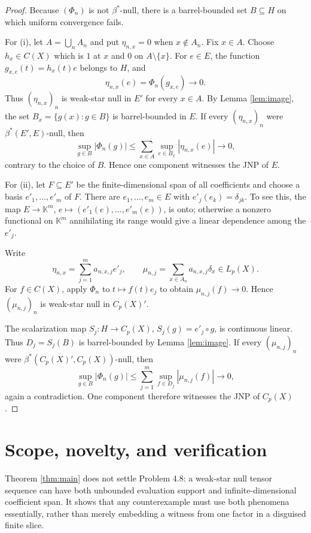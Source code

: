 \documentclass[11pt]{article}
\newcommand{\K}{\mathbb K}
\begin{document}
\begin{proof}
Because $(\Phi_n)$ is not $\beta^*$-null, there is a barrel-bounded set
$B\subseteq H$ on which uniform convergence fails.

For (i), let $A=\bigcup_n A_n$ and put $\eta_{n,x}=0$ when
$x\notin A_n$.  Fix $x\in A$.  Choose $h_x\in C(X)$ which is $1$ at $x$
and $0$ on $A\setminus\{x\}$.  For $e\in E$, the function
$g_{x,e}(t)=h_x(t)e$ belongs to $H$, and
\[
  \eta_{n,x}(e)=\Phi_n(g_{x,e})\longrightarrow 0.
\]
Thus $(\eta_{n,x})_n$ is weak-star null in $E'$ for every $x\in A$.
By Lemma \ref{lem:image}, the set
$B_x=\{g(x):g\in B\}$ is barrel-bounded in $E$.  If every
$(\eta_{n,x})_n$ were $\beta^*(E',E)$-null, then
\[
  \sup_{g\in B}|\Phi_n(g)|
  \leq \sum_{x\in A}\sup_{e\in B_x}|\eta_{n,x}(e)|
  \longrightarrow 0,
\]
contrary to the choice of $B$.  Hence one component witnesses the JNP of
$E$.

For (ii), let $F\subseteq E'$ be the finite-dimensional span of all
coefficients and choose a basis $e'_1,\dots,e'_m$ of $F$.  There are
$e_1,\dots,e_m\in E$ with $e'_j(e_k)=\delta_{jk}$.  To see this, the map
$E\to\K^m$, $e\mapsto(e'_1(e),\dots,e'_m(e))$, is onto; otherwise a
nonzero functional on $\K^m$ annihilating its range would give a linear
dependence among the $e'_j$.

Write
\[
  \eta_{n,x}=\sum_{j=1}^m a_{n,x,j}e'_j,
  \qquad
  \mu_{n,j}=\sum_{x\in A_n}a_{n,x,j}\delta_x\in L_p(X).
\]
For $f\in C(X)$, apply $\Phi_n$ to $t\mapsto f(t)e_j$ to obtain
$\mu_{n,j}(f)\to0$.  Hence $(\mu_{n,j})_n$ is weak-star null in
$C_p(X)'$.

The scalarization map $S_j:H\to C_p(X)$,
$S_j(g)=e'_j\circ g$, is continuous linear.  Thus
$D_j=S_j(B)$ is barrel-bounded by Lemma \ref{lem:image}.  If every
$(\mu_{n,j})_n$ were $\beta^*(C_p(X)',C_p(X))$-null, then
\[
  \sup_{g\in B}|\Phi_n(g)|
  \leq \sum_{j=1}^m\sup_{f\in D_j}|\mu_{n,j}(f)|
  \longrightarrow0,
\]
again a contradiction.  One component therefore witnesses the JNP of
$C_p(X)$.
\end{proof}

\section{Scope, novelty, and verification}

Theorem \ref{thm:main} does not settle Problem 4.8: a weak-star null tensor
sequence can have both unbounded evaluation support and
infinite-dimensional coefficient span.  It shows that any counterexample must
use both phenomena essentially, rather than merely embedding a witness from
one factor in a disguised finite slice.
\end{document}
